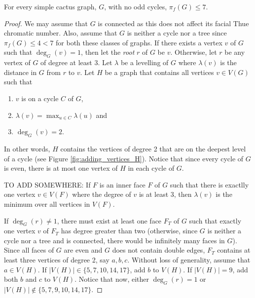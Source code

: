 \documentclass{patmorin}
\begin{document}
\begin{lem}
  For every simple cactus graph, $G$, with no odd cycles, $\pi_f(G)\le 7$.
\end{lem}

\begin{proof}
 We may assume that $G$ is connected as this does not affect its facial Thue chromatic number. Also, assume that $G$ is neither a cycle nor a tree since $\pi_f(G) \leq 4 < 7$ for both these classes of graphs.  
 If there exists a vertex $v$ of $G$ such that $\deg_G(v)=1$, then let
 the \emph{root} $r$ of $G$ be $v$. Otherwise, let $r$ be any vertex
 of $G$ of degree at least $3$. Let $\lambda$ be a levelling of $G$ where
 $\lambda(v)$ is the distance in $G$ from $r$ to $v$. Let $H$ be a graph that contains all vertices $v\in V(G)$ such that
 \begin{enumerate}
  \item $v$ is on a cycle $C$ of $G$,
  \item $\lambda(v)=\max_{u \in C} \lambda(u)$ and
  \item $\deg_G(v)=2$.
 \end{enumerate} 
 In other words, $H$ contains the vertices of degree 2 that are on the
 deepest level of a cycle (see Figure
 \ref{fig:adding_vertices_H}). Notice that since every cycle of $G$ is
 even, there is at most one vertex of $H$ in each cycle of $G$.


TO ADD SOMEWHERE: If $F$ is an inner face $F$ of $G$ such that there is exactlly
one vertex $v\in V(F)$ where the degree of $v$ is at least $3$, then
$\lambda(v)$ is the minimum over all vertices in $V(F)$. 


 If $\deg_G(r)\not=1$, there must exist at least one face $F_T$ of $G$ such that exactly one vertex $v$ of $F_T$ has degree greater than two (otherwise, since $G$ is neither a cycle nor a tree and is connected, there would be infinitely many faces in $G$). Since all faces of $G$ are even and $G$ does not contain double edges, $F_T$ contains at least three vertices of degree 2, say $a,b,c$. Without loss of generality, assume that $a \in V(H)$. If $|V(H)|\in \{5,7,10,14,17\}$, add $b$ to $V(H)$. If $|V(H)|=9$, add both $b$ and $c$ to $V(H)$. Notice that now, either $\deg_G(r)=1$ or $|V(H)|\notin \{5,7,9,10,14,17\}$.
 

\end{proof}
\end{document}
